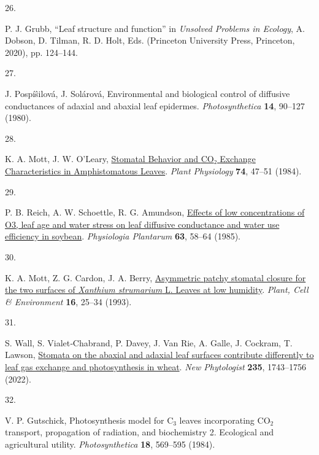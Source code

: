 \documentclass[
  letterpaper,
  DIV=11,
  numbers=noendperiod]{scrartcl}
\newlength{\cslhangindent}
\newlength{\csllabelwidth}
\newenvironment{CSLReferences}[2] %
 {\begin{list}{}{%
  \setlength{\itemindent}{0pt}
  \setlength{\leftmargin}{0pt}
  \setlength{\parsep}{0pt}
  \ifodd #1
   \setlength{\leftmargin}{\cslhangindent}
   \setlength{\itemindent}{-1\cslhangindent}
  \fi
  \setlength{\itemsep}{#2\baselineskip}}}
 {\end{list}}
\newcommand{\CSLLeftMargin}[1]{\parbox[t]{\csllabelwidth}{\strut#1\strut}}
\newcommand{\CSLRightInline}[1]{\parbox[t]{\linewidth - \csllabelwidth}{\strut#1\strut}}
\begin{document}
\begin{CSLReferences}{0}{1}
\CSLLeftMargin{26. }%
\CSLRightInline{P. J. Grubb, {``Leaf structure and function''} in
\emph{Unsolved {Problems} in {Ecology}}, A. Dobson, D. Tilman, R. D.
Holt, Eds. (Princeton University Press, Princeton, 2020), pp. 124--144.}

\CSLLeftMargin{27. }%
\CSLRightInline{J. Pospíŝilová, J. Solárová, Environmental and
biological control of diffusive conductances of adaxial and abaxial leaf
epidermes. \emph{Photosynthetica} \textbf{14}, 90--127 (1980).}

\CSLLeftMargin{28. }%
\CSLRightInline{K. A. Mott, J. W. O'Leary,
\href{http://www.jstor.org/stable/4268406}{Stomatal {Behavior} and {CO}₂
{Exchange} {Characteristics} in {Amphistomatous} {Leaves}}. \emph{Plant
Physiology} \textbf{74}, 47--51 (1984).}

\CSLLeftMargin{29. }%
\CSLRightInline{P. B. Reich, A. W. Schoettle, R. G. Amundson,
\href{https://doi.org/10.1111/j.1399-3054.1985.tb02818.x}{Effects of low
concentrations of {O3}, leaf age and water stress on leaf diffusive
conductance and water use efficiency in soybean}. \emph{Physiologia
Plantarum} \textbf{63}, 58--64 (1985).}

\CSLLeftMargin{30. }%
\CSLRightInline{K. A. Mott, Z. G. Cardon, J. A. Berry,
\href{https://doi.org/10.1111/j.1365-3040.1993.tb00841.x}{Asymmetric
patchy stomatal closure for the two surfaces of \emph{{Xanthium}
strumarium} {L}. Leaves at low humidity}. \emph{Plant, Cell \&
Environment} \textbf{16}, 25--34 (1993).}

\CSLLeftMargin{31. }%
\CSLRightInline{S. Wall, S. Vialet‐Chabrand, P. Davey, J. Van Rie, A.
Galle, J. Cockram, T. Lawson,
\href{https://doi.org/10.1111/nph.18257}{Stomata on the abaxial and
adaxial leaf surfaces contribute differently to leaf gas exchange and
photosynthesis in wheat}. \emph{New Phytologist} \textbf{235},
1743--1756 (2022).}

\CSLLeftMargin{32. }%
\CSLRightInline{V. P. Gutschick, Photosynthesis model for
{C}\(_{\textrm{3}}\) leaves incorporating {CO}\(_{\textrm{2}}\)
transport, propagation of radiation, and biochemistry 2. Ecological and
agricultural utility. \emph{Photosynthetica} \textbf{18}, 569--595
(1984).}


\end{CSLReferences}
\end{document}
